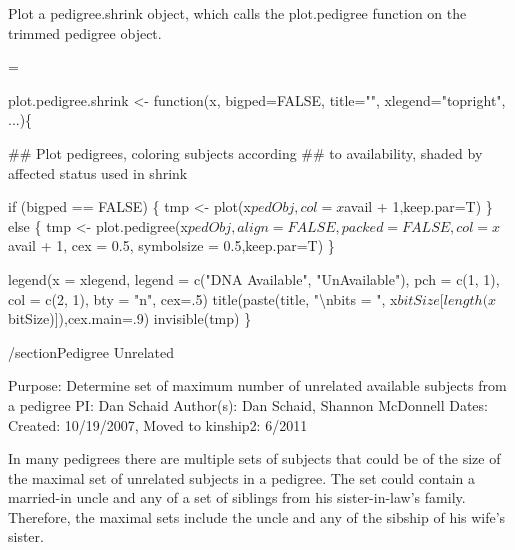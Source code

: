 \documentclass{article}
\begin{document}
Plot a pedigree.shrink object, which calls the plot.pedigree function on the trimmed 
pedigree object.

\begin{nwchunk}
=
 
 plot.pedigree.shrink <- function(x, bigped=FALSE, title="", xlegend="topright", ...)\{
 
   ##  Plot pedigrees, coloring subjects according
   ##   to availability, shaded by affected status used in shrink
 
 if (bigped == FALSE) \{
 tmp <- plot(x$pedObj, col = x$avail + 1,keep.par=T)
 \}
 else \{
 tmp <- plot.pedigree(x$pedObj, align = FALSE, packed = FALSE, 
 col = x$avail + 1, cex = 0.5, symbolsize = 0.5,keep.par=T)
 \}
 
 legend(x = xlegend, legend = c("DNA Available", "UnAvailable"), 
 pch = c(1, 1), col = c(2, 1), bty = "n", cex=.5)
 title(paste(title, "{\textbackslash}nbits = ", x$bitSize[length(x$bitSize)]),cex.main=.9)
 invisible(tmp)
 \} 
 
\end{nwchunk}

/section{Pedigree Unrelated}

Purpose: Determine set of maximum number of unrelated
available subjects from a pedigree
PI:      Dan Schaid
Author(s): Dan Schaid, Shannon McDonnell
Dates:   Created: 10/19/2007, Moved to kinship2: 6/2011

In many pedigrees there are multiple sets of subjects that could be of the 
size of the maximal set of unrelated subjects in a pedigree.  The set could
contain a married-in uncle and any of a set of siblings from his 
sister-in-law's family.  Therefore, the maximal sets include the uncle and 
any of the sibship of his wife's sister.
\end{document}
